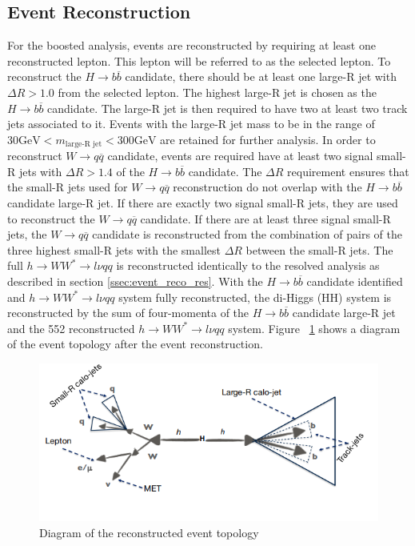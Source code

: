 \subsection{Event Reconstruction}
For the boosted analysis, events are reconstructed by requiring at least one reconstructed lepton. This lepton will be referred to as the selected lepton. To reconstruct the ${H\rightarrow b\overline{b}}$ candidate, there should be at least one large-R jet with ${\Delta{R} > 1.0}$ from the selected lepton. The highest \pT large-R jet is chosen as the ${H\rightarrow b\overline{b}}$ candidate. The large-R jet is then required to have two at least two track jets associated to it. Events with the large-R jet mass to be in the range of ${30 \mathrm{GeV} < m_{\textrm{large-R jet}} < 300 \mathrm{GeV}}$ are retained for further analysis.\newline
\indent In order to reconstruct ${W\rightarrow q\overline{q}}$ candidate, events are required have at least two signal small-R jets with ${\Delta{R} > 1.4}$ of the ${H\rightarrow b\overline{b}}$ candidate. The ${\Delta{R}}$ requirement ensures that the small-R jets used for ${W\rightarrow q\overline{q}}$ reconstruction do not overlap with the ${H\rightarrow b\overline{b}}$ candidate large-R jet. If there are exactly two signal small-R jets, they are used to reconstruct the ${W\rightarrow q\overline{q}}$ candidate. If there are at least three signal small-R jets, the ${W\rightarrow q\overline{q}}$ candidate is reconstructed from the combination of pairs of the three highest \pT small-R jets with the smallest ${\Delta{R}}$ between the small-R jets.\newline
\indent The full ${h\rightarrow WW^{*}\rightarrow l\nu qq}$ is reconstructed identically to the resolved analysis as described in section \ref{ssec:event_reco_res}.
With the ${H\rightarrow b\overline{b}}$ candidate identified and ${h\rightarrow WW^{*}\rightarrow l\nu qq}$ system fully reconstructed, the di-Higgs (HH) system is reconstructed by the sum of four-momenta of the ${H\rightarrow b\overline{b}}$ candidate large-R jet and the 552 reconstructed ${h\rightarrow WW^{*}\rightarrow l\nu qq}$ system. Figure ~\ref{fig:boost_topo} shows a diagram of the event topology after the event reconstruction.

\begin{figure}[h]
\begin{center}
\includegraphics[scale=0.65]{figures/boosted_topo}
\caption{Diagram of the reconstructed event topology}
\label{fig:boost_topo}
\end{center}
\end{figure}

